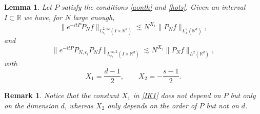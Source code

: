 \documentclass[10pt,leqno]{amsart}
\newtheorem{lem}[thm]{Lemma}
\newtheorem{rmq}[thm]{Remark}
\newcommand{\R}{\mathbb{R}}
\numberwithin{equation}{section}
\begin{document}
\begin{lem}
\label{1lemIK}
Let \(P\) satisfy the conditions \eqref{aonth} and \eqref{hots}. Given an interval $I\subset \R$ we have, for $N$ large enough,
\begin{equation}\label{IK1}
\| e^{-it P }  P_N f\|_{L_{e_l}^{2,\infty} (I\times \R^d)}\lesssim N^{X_1} \|P_N f\|_{L_x^2 (\R^d )},
\end{equation}
and
\begin{equation}
\label{IK3}
\|e^{-it P}  P_{N, e_l }  P_N f \|_{L_{e_l}^{\infty ,2} (I \times \R^d)} \lesssim N^{X_2} \|P_N f\|_{L^2 (\R^d )},
\end{equation}
with
$$X_1 =\dfrac{d-1}{2} ,\qquad X_2= -\dfrac{s-1}{2}.$$
\end{lem}
\begin{rmq}
Notice that the constant $X_1$ in \eqref{IK1} does not depend on $P$ but only on the dimension $d$, whereas $X_2$ only depends on the order of $P$ but not on $d$.
\end{rmq}
\end{document}
